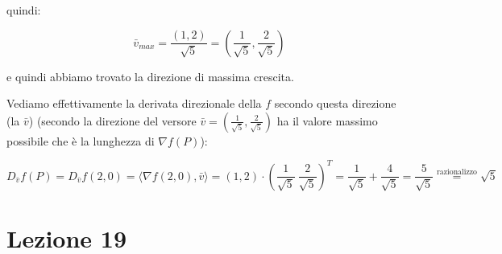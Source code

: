 \documentclass[11pt]{article}
\begin{document}
quindi:

\[
    \bar{v}_{max} = \frac{(1,2)}{\sqrt{5}} = (\frac{1}{\sqrt{5}}, \frac{2}{\sqrt{5}})
\]

e quindi abbiamo trovato la direzione di massima crescita.


Vediamo effettivamente la derivata direzionale della $f$ secondo questa direzione (la $\bar{v}$) (secondo la direzione del versore $\bar{v} =( \frac{1}{\sqrt{5}}, \frac{2}{\sqrt{5}})$ ha il valore massimo possibile che è la lunghezza di $\nabla f(P)$):

\[
    D_{\bar{v} } f(P) = D_{\bar{v} } f(2,0) = \langle \nabla f(2,0), \bar{v}  \rangle = (1,2) \cdot (\frac{1}{\sqrt{5}}\ \frac{2}{\sqrt{5}})^{T} = \frac{1}{\sqrt{5}}+ \frac{4}{\sqrt{5}} = \frac{5}{\sqrt{5}} \overset{\text{razionalizzo}}{=} \sqrt{5}
\]

\section{Lezione 19}

\end{document}

